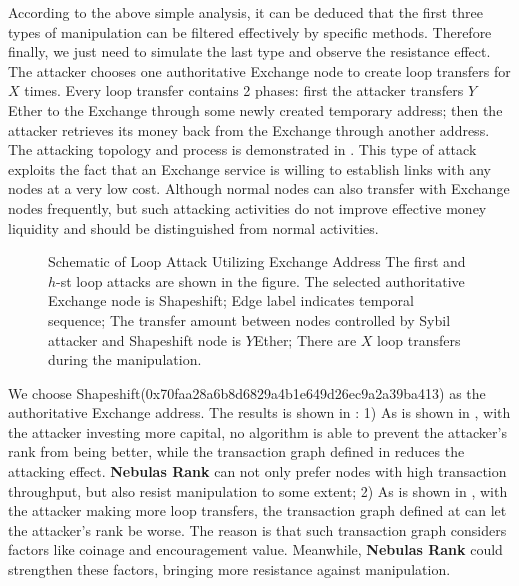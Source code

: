 According to the above simple analysis, it can be deduced that the first three types of manipulation can be filtered effectively by specific methods. Therefore finally, we just need to simulate the last type and observe the resistance effect. The attacker chooses one authoritative Exchange node to create loop transfers for $X$ times. Every loop transfer contains 2 phases: first the attacker transfers $Y$ Ether to the Exchange through some newly created temporary address; then the attacker retrieves its money back from the Exchange through another address. The attacking topology and process is demonstrated in . This type of attack exploits the fact that an Exchange service is willing to establish links with any nodes at a very low cost. Although normal nodes can also transfer with Exchange nodes frequently, but such attacking activities do not improve effective money liquidity and should be distinguished from normal activities.
\begin{figure}[!ht]
	\centering
  
	\caption{Schematic of Loop Attack Utilizing Exchange Address \small{The first and $h$-st loop attacks are shown in the figure. The selected authoritative Exchange node is Shapeshift; Edge label indicates temporal sequence; The transfer amount between nodes controlled by Sybil attacker and Shapeshift node is $Y$Ether; There are $X$ loop transfers during the manipulation.}}\label{fig:loop}
\end{figure}

We choose Shapeshift(0x70faa28a6b8d6829a4b1e649d26ec9a2a39ba413) as the authoritative Exchange address. The results is shown in : 1) As is shown in , with the attacker investing more capital, no algorithm is able to prevent the attacker's rank from being better, while the transaction graph defined in  reduces the attacking effect. \textbf{Nebulas Rank} can not only prefer nodes with high transaction throughput, but also resist manipulation to some extent; 2) As is shown in , with the attacker making more loop transfers, the transaction graph defined at  can let the attacker's rank be worse. The reason is that such transaction graph considers factors like coinage and encouragement value. Meanwhile, \textbf{Nebulas Rank} could strengthen these factors, bringing more resistance against manipulation.


